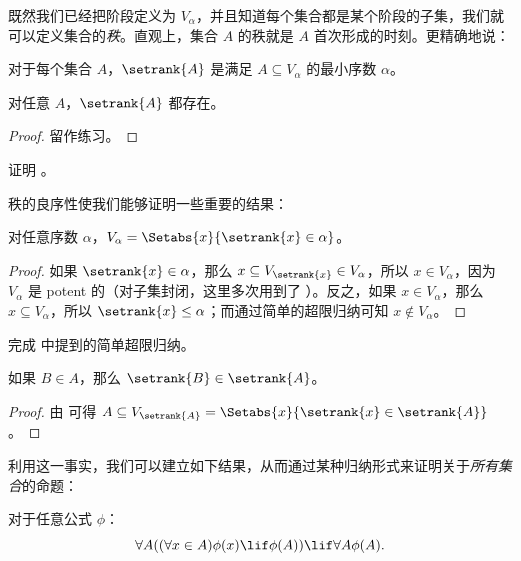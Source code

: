 \documentclass[../../../include/open-logic-section]{subfiles}
\begin{document}

既然我们已经把阶段定义为 $V_\alpha$，并且知道每个集合都是某个阶段的子集，我们就可以定义集合的\emph{秩}。直观上，集合 $A$ 的秩就是 $A$ 首次形成的时刻。更精确地说：

\begin{defn}
对于每个集合 $A$，$\setrank{A}$ 是满足 $A \subseteq V_\alpha$ 的最小序数 $\alpha$。
\end{defn}
\begin{prop}
	对任意 $A$，$\setrank{A}$ 都存在。
\end{prop}
\begin{proof}
	留作练习。
\end{proof}
\begin{prob}
	证明 。
\end{prob}
\noindent
秩的良序性使我们能够证明一些重要的结果：
\begin{prop}
对任意序数 $\alpha$，$V_\alpha = \Setabs{x}{\setrank{x} \in \alpha}$。
\end{prop}

\begin{proof}
如果 $\setrank{x} \in \alpha$，那么 $x \subseteq V_{\setrank{x}} \in
V_\alpha$，所以 $x \in V_\alpha$，因为 $V_\alpha$ 是 potent 的（对子集封闭，这里多次用到了 ）。反之，如果 $x \in V_\alpha$，那么 $x \subseteq V_\alpha$，所以 $\setrank{x} \leq \alpha$；而通过简单的超限归纳可知 $x \notin V_\alpha$。
\end{proof}
\begin{prob}
	完成  中提到的简单超限归纳。
\end{prob}

\begin{prop}
如果 $B \in A$，那么 $\setrank{B} \in \setrank{A}$。
\end{prop}

\begin{proof}
由  可得 $A \subseteq V_{\setrank{A}} = \Setabs{x}{\setrank{x} \in
\setrank{A}}$。
\end{proof}
\noindent
利用这一事实，我们可以建立如下结果，从而通过某种归纳形式来证明关于\emph{所有集合}的命题：

\begin{thm}[$\in$-归纳原理]
对于任意公式 $\phi$：
\[
	\forall A((\forall x \in A)\phi(x) \lif \phi(A)) \lif \forall A \phi(A).
\]
\end{thm}
\end{document}
